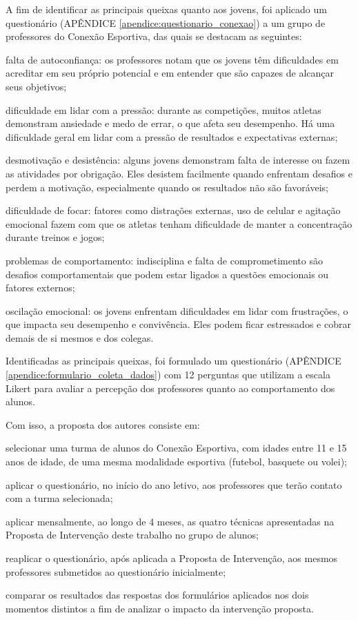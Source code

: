 \begin{Desenvolvimento}
A fim de identificar as principais queixas quanto aos jovens, foi aplicado um questionário (APÊNDICE \ref{apendice:questionario_conexao}) a um grupo de professores do Conexão Esportiva, das quais se destacam as seguintes:
\begin{alinea}
  \item falta de autoconfiança: os professores notam que os jovens têm dificuldades em acreditar em seu próprio potencial e em entender que são capazes de alcançar seus objetivos;
  \item dificuldade em lidar com a pressão: durante as competições, muitos atletas demonstram ansiedade e medo de errar, o que afeta seu desempenho. Há uma dificuldade geral em lidar com a pressão de resultados e expectativas externas;
  \item desmotivação e desistência: alguns jovens demonstram falta de interesse ou fazem as atividades por obrigação. Eles desistem facilmente quando enfrentam desafios e perdem a motivação, especialmente quando os resultados não são favoráveis;
  \item dificuldade de focar: fatores como distrações externas, uso de celular e agitação emocional fazem com que os atletas tenham dificuldade de manter a concentração durante treinos e jogos;
  \item problemas de comportamento: indisciplina e falta de comprometimento são desafios comportamentais que podem estar ligados a questões emocionais ou fatores externos;
  \item oscilação emocional: os jovens enfrentam dificuldades em lidar com frustrações, o que impacta seu desempenho e convivência. Eles podem ficar estressados e cobrar demais de si mesmos e dos colegas.
\end{alinea}

Identificadas as principais queixas, foi formulado um questionário (APÊNDICE \ref{apendice:formulario_coleta_dados}) com 12 perguntas que utilizam a escala Likert para avaliar a percepção dos professores quanto ao comportamento dos alunos.

Com isso, a proposta dos autores consiste em:
\begin{alinea}
  \item selecionar uma turma de alunos do Conexão Esportiva, com idades entre 11 e 15 anos de idade, de uma mesma modalidade esportiva (futebol, basquete ou volei);
  \item aplicar o questionário, no início do ano letivo, aos professores que terão contato com a turma selecionada;
  \item aplicar mensalmente, ao longo de 4 meses, as quatro técnicas apresentadas na Proposta de Intervenção deste trabalho no grupo de alunos;
  \item reaplicar o questionário, após aplicada a Proposta de Intervenção, aos mesmos professores submetidos ao questionário inicialmente;
  \item comparar os resultados das respostas dos formulários aplicados nos dois momentos distintos a fim de analizar o impacto da intervenção proposta.
\end{alinea}


\end{Desenvolvimento}
